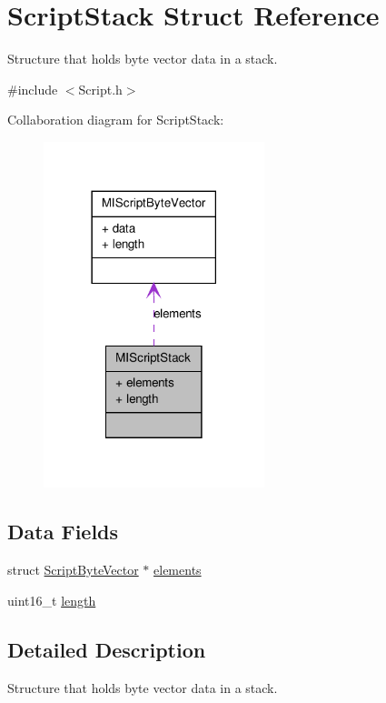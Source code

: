 \hypertarget{struct_m_i_script_stack}{
\section{ScriptStack Struct Reference}
\label{struct_m_i_script_stack}
}


Structure that holds byte vector data in a stack.  




{\ttfamily \#include $<$Script.h$>$}



Collaboration diagram for ScriptStack:\nopagebreak
\begin{figure}[H]
\begin{center}
\leavevmode
\includegraphics[width=182pt]{struct_m_i_script_stack__coll__graph}
\end{center}
\end{figure}
\subsection*{Data Fields}
\begin{DoxyCompactItemize}
\item 
struct \hyperlink{struct_m_i_script_byte_vector}{ScriptByteVector} $\ast$ \hyperlink{struct_m_i_script_stack_a446fd0b9b98ef2754d5ccf283e840f19}{elements}
\item 
uint16\_\-t \hyperlink{struct_m_i_script_stack_a1892eba2086d12ac2b09005aeb09ea3b}{length}
\end{DoxyCompactItemize}


\subsection{Detailed Description}
Structure that holds byte vector data in a stack. 

